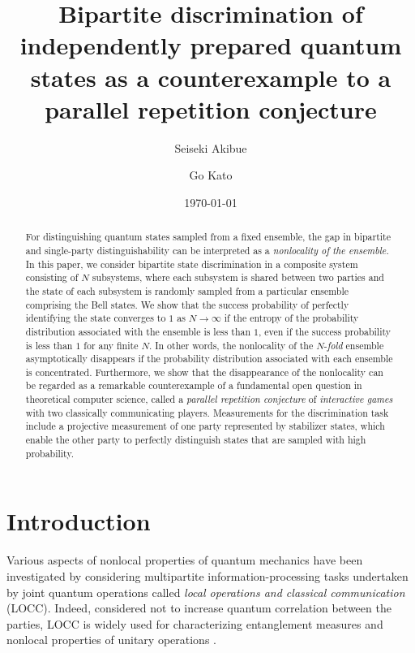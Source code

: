 \documentclass[aps,prx,twocolumn,showpacs,amsmath,notitlepage,amssymb,superscriptaddress]{revtex4-1}
\begin{document}
\title{Bipartite discrimination of independently prepared quantum states as a counterexample to a parallel repetition conjecture}
\author{Seiseki Akibue}
 
\author{Go Kato}

\date{\today}

\begin{abstract}
For distinguishing quantum states sampled from a fixed ensemble, the gap in bipartite and single-party distinguishability can be interpreted as a  {\it nonlocality of the ensemble.} In this paper, we consider bipartite state discrimination in a composite system consisting of $N$ subsystems, where each subsystem is shared between two parties and the state of each subsystem is randomly sampled from a particular ensemble comprising the Bell states. We show that the success probability of perfectly identifying the state converges to $1$ as $N\rightarrow\infty$ if the entropy of the probability distribution associated with the ensemble is less than $1$, even if the success probability is less than $1$ for any finite $N$. In other words, the nonlocality of the $N$-{\it fold} ensemble asymptotically disappears if the probability distribution associated with each ensemble is concentrated. Furthermore, we show that the disappearance of the nonlocality can be regarded as a remarkable counterexample of a fundamental open question in theoretical computer science, called a {\it parallel repetition conjecture} of {\it interactive games} with two classically communicating players. Measurements for the discrimination task include a projective measurement of one party represented by stabilizer states, which enable the other party to perfectly distinguish states that are sampled with high probability.
\end{abstract}

\maketitle

\section{Introduction}
Various aspects of nonlocal properties of quantum mechanics have been investigated by considering multipartite information-processing tasks undertaken by joint quantum operations called {\it local operations and classical communication} (LOCC). Indeed, considered not to increase quantum correlation between the parties, LOCC is widely used for characterizing entanglement measures \cite{VVedral, Horodecki, MBPlenio} and nonlocal properties of unitary operations \cite{Soeda1, Stahlke, Soeda2}.
\end{document}
